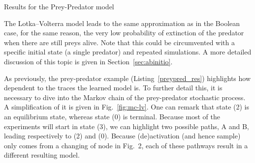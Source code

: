 \documentclass{llncs}
\begin{document}
% 	

\begin{listfig}[htb]
	
	\caption{Results for the Prey-Predator model\label{preypred_res}}
\end{listfig}

The Lotka--Volterra model leads to the same approximation as in the
Boolean case, for the same reason, the very low probability of extinction of
the predator when there are still preys alive. Note that this could be
circumvented with a specific initial state (a single predator) and repeated
simulations. A more detailed discussion of this topic is given in
Section~\ref{sec:abinitio}.

As previously, the prey-predator example (Listing~\ref{preypred_res}) highlights how dependent to the traces the learned model is.
To further detail this, it is necessary to dive into the Markov chain of the prey-predator stochastic process. A simplification of it is given in Fig.~\ref{fig:mc-lv}. One can remark that state (2) is an equilibrium state, whereas state (0) is terminal. Because most of the experiments will start in state (3), we can highlight two possible paths, A and B, leading respectively to (2) and (0). Because (de)activation (and hence sample) only comes from a changing of node in Fig.~2, each of these pathways result in a different resulting model.
\end{document}
